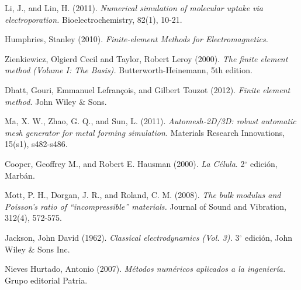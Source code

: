 \begin{thebibliography}{99}
	Li, J., and Lin, H. (2011). \emph{Numerical simulation of molecular uptake via electroporation.} Bioelectrochemistry, 82(1), 10-21.

	Humphries, Stanley (2010). \emph{Finite-element Methods for Electromagnetics.}

	Zienkiewicz, Olgierd Cecil and Taylor, Robert Leroy (2000). \emph{The finite element method (Volume I: The Basis).} Butterworth-Heinemann, 5th edition.
	
	Dhatt, Gouri, Emmanuel Lefrançois, and Gilbert Touzot (2012). \emph{Finite element method.} John Wiley \& Sons.

	Ma, X. W., Zhao, G. Q., and Sun, L. (2011). \emph{Automesh-2D/3D: robust automatic mesh generator for metal forming simulation.} Materials Research Innovations, 15(s1), s482-s486.

	Cooper, Geoffrey M., and Robert E. Hausman (2000). \emph{La Célula}. 2$^{\circ}$ edición, Marbán.

	Mott, P. H., Dorgan, J. R., and Roland, C. M. (2008). \emph{The bulk modulus and Poisson's ratio of ``incompressible'' materials.} Journal of Sound and Vibration, 312(4), 572-575.
	
	Jackson, John David (1962). \emph{Classical electrodynamics (Vol. 3).} 3$^{\circ}$ edición, John Wiley \& Sons Inc.

	Nieves Hurtado, Antonio (2007). \emph{Métodos numéricos aplicados a la ingeniería.} Grupo editorial Patria.


\end{thebibliography}
